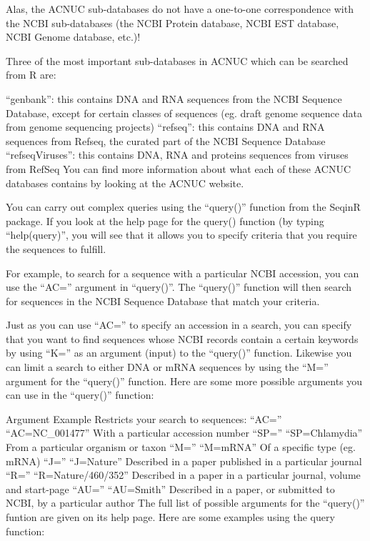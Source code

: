 \documentclass[
]{book}
\begin{document}
Alas, the ACNUC sub-databases do not have a one-to-one correspondence with the NCBI sub-databases (the NCBI Protein database, NCBI EST database, NCBI Genome database, etc.)!

Three of the most important sub-databases in ACNUC which can be searched from R are:

``genbank'': this contains DNA and RNA sequences from the NCBI Sequence Database, except for certain classes of sequences (eg. draft genome sequence data from genome sequencing projects)
``refseq'': this contains DNA and RNA sequences from Refseq, the curated part of the NCBI Sequence Database
``refseqViruses'': this contains DNA, RNA and proteins sequences from viruses from RefSeq
You can find more information about what each of these ACNUC databases contains by looking at the ACNUC website.

You can carry out complex queries using the ``query()'' function from the SeqinR package. If you look at the help page for the query() function (by typing ``help(query)'', you will see that it allows you to specify criteria that you require the sequences to fulfill.

For example, to search for a sequence with a particular NCBI accession, you can use the ``AC='' argument in ``query()''. The ``query()'' function will then search for sequences in the NCBI Sequence Database that match your criteria.

Just as you can use ``AC='' to specify an accession in a search, you can specify that you want to find sequences whose NCBI records contain a certain keywords by using ``K='' as an argument (input) to the ``query()'' function. Likewise you can limit a search to either DNA or mRNA sequences by using the ``M='' argument for the ``query()'' function. Here are some more possible arguments you can use in the ``query()'' function:

Argument Example Restricts your search to sequences:
``AC='' ``AC=NC\_001477'' With a particular accession number
``SP='' ``SP=Chlamydia'' From a particular organism or taxon
``M='' ``M=mRNA'' Of a specific type (eg. mRNA)
``J='' ``J=Nature'' Described in a paper published in a particular journal
``R='' ``R=Nature/460/352'' Described in a paper in a particular journal, volume and start-page
``AU='' ``AU=Smith'' Described in a paper, or submitted to NCBI, by a particular author
The full list of possible arguments for the ``query()'' funtion are given on its help page. Here are some examples using the query function:
\end{document}
